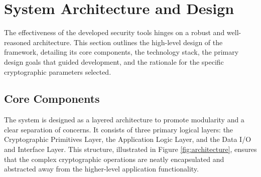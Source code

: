 \documentclass[12pt, letterpaper]{article}
\begin{document}
\section{System Architecture and Design}
The effectiveness of the developed security tools hinges on a robust and well-reasoned architecture. This section outlines the high-level design of the framework, detailing its core components, the technology stack, the primary design goals that guided development, and the rationale for the specific cryptographic parameters selected.

\subsection{Core Components}
The system is designed as a layered architecture to promote modularity and a clear separation of concerns. It consists of three primary logical layers: the Cryptographic Primitives Layer, the Application Logic Layer, and the Data I/O and Interface Layer. This structure, illustrated in Figure \ref{fig:architecture}, ensures that the complex cryptographic operations are neatly encapsulated and abstracted away from the higher-level application functionality.
\end{document}
